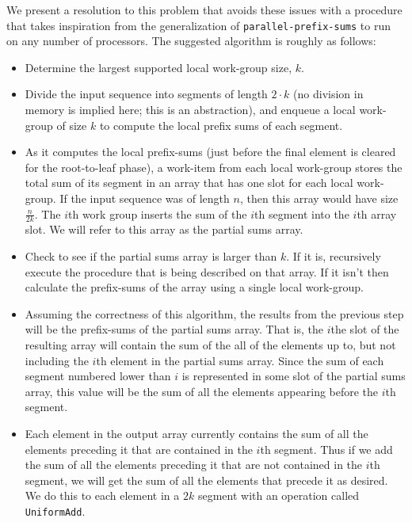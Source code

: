 \documentclass[12pt,twoside]{reedthesis}
\newcommand{\procedure}[1]{{\tt#1}}
\begin{document}
We present a resolution to this problem that avoids these issues with a procedure that takes inspiration from the generalization of  \procedure{parallel-prefix-sums} to run on any number of processors. The suggested algorithm is roughly as follows:

\begin{itemize}

\item Determine the largest supported local work-group size, $k$.

\item Divide the input sequence into segments of length $2\cdot k$ (no division in memory is implied here; this is an abstraction), and enqueue a local work-group of size $k$ to compute the local prefix sums of each segment.

\item As it computes the local prefix-sums (just before the final element is cleared for the root-to-leaf phase), a work-item from each local work-group stores the total sum of its segment in an array that has one slot for each local work-group. If the input sequence was of length $n$, then this array would have size $\frac{n}{2k}$. The $i$th work group inserts the sum of the $i$th segment into the $i$th array slot. We will refer to this array as the partial sums array.

\item Check to see if the partial sums array is larger than $k$. If it is, recursively execute the procedure that is being described on that array. If it isn't then calculate the prefix-sums of the array using a single local work-group.

\item Assuming the correctness of this algorithm, the results from the previous step will be the prefix-sums of the partial sums array. That is, the $i$the slot of the resulting array will contain the sum of the all of the elements up to, but not including the $i$th element in the partial sums array. Since the sum of each segment numbered lower than $i$ is represented in some slot of the partial sums array, this value will be the sum of all the elements appearing before the $i$th segment.

\item Each element in the output array currently contains the sum of all the elements preceding it that are contained in the $i$th segment. Thus if we add the sum of all the elements preceding it that are not contained in the $i$th segment, we will get the sum of all the elements that precede it as desired. We do this to each element in a $2k$ segment with an operation called \procedure{UniformAdd}.

\end{itemize}
\end{document}
